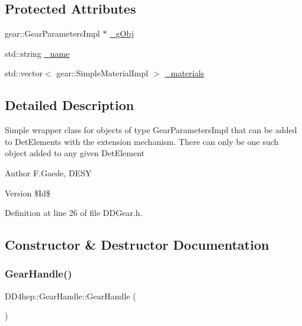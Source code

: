 \subsection*{Protected Attributes}
\begin{DoxyCompactItemize}
\item 
gear\+::\+Gear\+Parameters\+Impl $\ast$ \hyperlink{class_d_d4hep_1_1_gear_handle_a211b76e59d3561a189c0f5b3b7186d08}{\+\_\+g\+Obj}
\item 
std\+::string \hyperlink{class_d_d4hep_1_1_gear_handle_a73f13b4c51b157ad9ff56335a5063d3b}{\+\_\+name}
\item 
std\+::vector$<$ gear\+::\+Simple\+Material\+Impl $>$ \hyperlink{class_d_d4hep_1_1_gear_handle_a7a666fef6469ba28d864d41e16000c29}{\+\_\+materials}
\end{DoxyCompactItemize}


\subsection{Detailed Description}
Simple wrapper class for objects of type Gear\+Parameters\+Impl that can be added to Det\+Elements with the extension mechanism. There can only be one such object added to any given Det\+Element \begin{DoxyAuthor}{Author}
F.\+Gaede, D\+E\+SY 
\end{DoxyAuthor}
\begin{DoxyVersion}{Version}
\$\+Id\$ 
\end{DoxyVersion}


Definition at line 26 of file D\+D\+Gear.\+h.



\subsection{Constructor \& Destructor Documentation}
\hypertarget{class_d_d4hep_1_1_gear_handle_a782739bfe116441082e6b4597bb6bf6e}{}\label{class_d_d4hep_1_1_gear_handle_a782739bfe116441082e6b4597bb6bf6e} 
\subsubsection{\texorpdfstring{Gear\+Handle()}{GearHandle()}\hspace{0.1cm}{\footnotesize\ttfamily [1/4]}}
{\footnotesize\ttfamily D\+D4hep\+::\+Gear\+Handle\+::\+Gear\+Handle (\begin{DoxyParamCaption}{ }\end{DoxyParamCaption})\hspace{0.3cm}{\ttfamily [inline]}}


